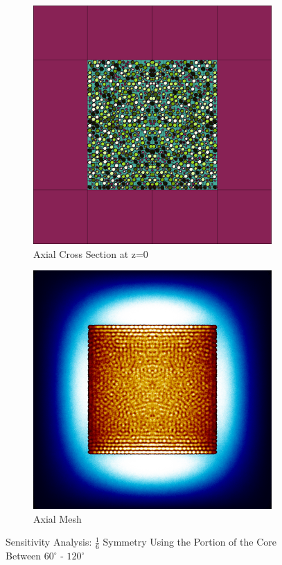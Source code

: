 \begin{figure}[H]
\begin{subfigure}{0.45\textwidth}
  \includegraphics[width=0.95\linewidth]{figures/60-120/60-120-v}
  \caption{Axial Cross Section at z=0 }
  \label{fig:60-120-v}
\end{subfigure}
%
\begin{subfigure}{0.45\textwidth}
  \includegraphics[width=0.95\linewidth]{figures/60-120/60-120-vm}
  \caption{Axial Mesh}
  \label{fig:60-120-vm}
\end{subfigure}
%
\caption{Sensitivity Analysis: $\frac{1}{6}$ Symmetry Using the Portion of the Core Between $60^{\circ}$ - $120^{\circ}$}
\label{fig:6012345}
\end{figure}